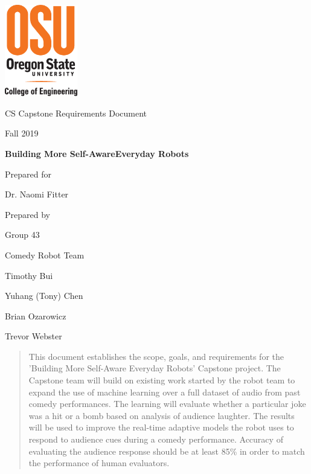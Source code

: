 \documentclass[onecolumn, draftclsnofoot,10pt, compsoc]{IEEEtran}
\def \CapstoneTeamName{		    Comedy Robot Team}
\def \CapstoneTeamNumber{		43}
\def \GroupMemberOne{			Timothy Bui}
\def \GroupMemberTwo{			Yuhang (Tony) Chen}
\def \GroupMemberThree{			Brian Ozarowicz}
\def \GroupMemberFour{			Trevor Webster}
\def \CapstoneProjectName{		Building More Self-Aware\linebreak Everyday Robots}
\def \CapstoneSponsorCompany{	SHARE Lab}
\def \CapstoneSponsorPerson{	Dr. Naomi Fitter}
\def \DocType{	%
				Requirements Document
				}
\newcommand{\NameSigPair}[1]{\par
\makebox[2.75in][r]{#1} \hfil 	\makebox[3.25in]{\makebox[2.25in]{\hrulefill} \hfill		\makebox[.75in]{\hrulefill}}
\par\vspace{-12pt} \textit{\tiny\noindent
\makebox[2.75in]{} \hfil		\makebox[3.25in]{\makebox[2.25in][r]{Signature} \hfill	\makebox[.75in][r]{Date}}}}
\renewcommand{\NameSigPair}[1]{#1}
\begin{document}
\begin{titlepage}
    \begin{singlespace}
    	\includegraphics[height=4cm]{coe_v_spot1}
        \hfill 
        \par\vspace{.2in}
        \centering
        \scshape{
            \huge CS Capstone \DocType \par
            {\large Fall 2019}\par
            \vspace{.5in}
            \textbf{\Huge\CapstoneProjectName}\par
            \vfill
            {\large Prepared for}\par
            {\Large\NameSigPair{\CapstoneSponsorPerson}\par}
            {\large Prepared by }\par
            Group\CapstoneTeamNumber\par
            \CapstoneTeamName\par 
            \vspace{5pt}
            {\Large
                \NameSigPair{\GroupMemberOne}\par
                \NameSigPair{\GroupMemberTwo}\par
                \NameSigPair{\GroupMemberThree}\par
                \NameSigPair{\GroupMemberFour}\par
            }
            \vspace{20pt}
        }
        \begin{abstract}
        	\noindent This document establishes the scope, goals, and requirements for the 'Building More Self-Aware Everyday Robots' Capstone project. The Capstone team will build on existing work started by the robot team to expand the use of machine learning over a full dataset of audio from past comedy performances. The learning will evaluate whether a particular joke was a hit or a bomb based on analysis of audience laughter. The results will be used to improve the real-time adaptive models the robot uses to respond to audience cues during a comedy performance. Accuracy of evaluating the audience response should be at least 85\% in order to match the performance of human evaluators.

\end{abstract}
\end{singlespace}
\end{titlepage}
\end{document}
